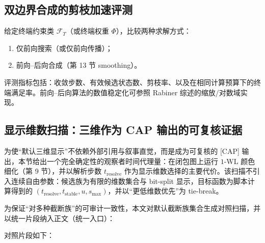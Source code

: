 \subsection{双边界合成的剪枝加速评测}

给定终端约束类 $\mathcal F_T$（或终端权重 $\Phi$），比较两种求解方式：
\begin{enumerate}
  \item 仅前向搜索（或仅前向传播）；
  \item 前向--后向合成（第 13 节 smoothing）。
\end{enumerate}
评测指标包括：收敛步数、有效候选状态数、剪枝率、以及在相同计算预算下的终端满足率。前向--后向算法的数值稳定化可参照 Rabiner 综述的缩放/对数域实现。\cite{rabiner_hmm_tutorial}

\subsection{显示维数扫描：三维作为 CAP 输出的可复核证据}

为使“默认三维显示”不依赖外部引用与叙事直觉，而是成为可复核的 \textsf{[CAP]} 输出，本节给出一个完全确定性的观察者时间代理量：在闭包图上运行 $1\text{-}\mathrm{WL}$ 颜色细化（第 9 节），并以解析步数 $t_{\mathrm{resolve}}$ 作为显示维数选择的主要代价。\AuditTag 该扫描不引入连续自由参数：候选族为有限的维数集合与 bit-split 显示，目标函数为脚本计算得到的 $(t_{\mathrm{resolve}},t_{\mathrm{stable}},u,s_{\max})$，并以“更低维数优先”为 tie-break。

为保证“对多种截断族”的可审计一致性，本文对默认截断族集合生成对照扫描，并以统一片段纳入正文（统一入口）：
\begin{center}
\end{center}
对照片段如下：


